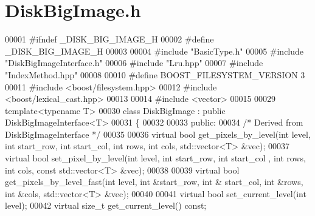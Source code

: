 \section{Disk\-Big\-Image.\-h}
\label{_disk_big_image_8h}

\begin{DoxyCode}
00001 \textcolor{preprocessor}{#ifndef \_DISK\_BIG\_IMAGE\_H}
00002 \textcolor{preprocessor}{}\textcolor{preprocessor}{#define \_DISK\_BIG\_IMAGE\_H}
00003 \textcolor{preprocessor}{}
00004 \textcolor{preprocessor}{#include "BasicType.h"}
00005 \textcolor{preprocessor}{#include "DiskBigImageInterface.h"}
00006 \textcolor{preprocessor}{#include "Lru.hpp"}
00007 \textcolor{preprocessor}{#include "IndexMethod.hpp"}
00008 
00010 \textcolor{preprocessor}{#define BOOST\_FILESYSTEM\_VERSION 3}
00011 \textcolor{preprocessor}{}\textcolor{preprocessor}{#include <boost/filesystem.hpp>}
00012 \textcolor{preprocessor}{#include <boost/lexical\_cast.hpp>}
00013 
00014 \textcolor{preprocessor}{#include <vector>}
00015 
00029 \textcolor{keyword}{template}<\textcolor{keyword}{typename} T>
00030 \textcolor{keyword}{class }DiskBigImage : \textcolor{keyword}{public} DiskBigImageInterface<T>
00031 \{
00032 
00033 \textcolor{keyword}{public}:
00034         \textcolor{comment}{/* Derived from DiskBigImageInterface */}
00035 
00036         \textcolor{keyword}{virtual} \textcolor{keywordtype}{bool} get_pixels_by_level(\textcolor{keywordtype}{int} level, \textcolor{keywordtype}{int} start\_row, \textcolor{keywordtype}{int} 
      start\_col, \textcolor{keywordtype}{int} rows, \textcolor{keywordtype}{int} cols, std::vector<T> &vec);
00037         \textcolor{keyword}{virtual} \textcolor{keywordtype}{bool} set\_pixel\_by\_level(\textcolor{keywordtype}{int} level, \textcolor{keywordtype}{int} start\_row, \textcolor{keywordtype}{int} start\_col
      , \textcolor{keywordtype}{int} rows, \textcolor{keywordtype}{int} cols, \textcolor{keyword}{const} std::vector<T> &vec);
00038 
00039     \textcolor{keyword}{virtual} \textcolor{keywordtype}{bool} get\_pixels\_by\_level\_fast(\textcolor{keywordtype}{int} level, \textcolor{keywordtype}{int} &start\_row, \textcolor{keywordtype}{int} &
      start\_col, \textcolor{keywordtype}{int} &rows, \textcolor{keywordtype}{int} &cols, std::vector<T> &vec);
00040 
00041         \textcolor{keyword}{virtual} \textcolor{keywordtype}{bool} set_current_level(\textcolor{keywordtype}{int} level);
00042         \textcolor{keyword}{virtual} \textcolor{keywordtype}{size\_t} get\_current\_level() \textcolor{keyword}{const}; 

\end{DoxyCode}
